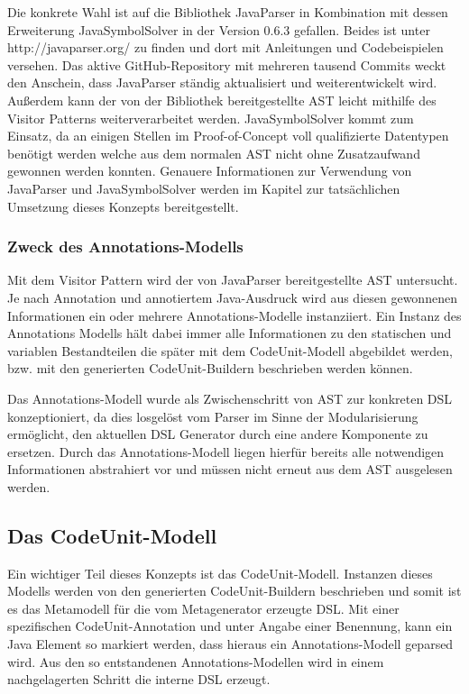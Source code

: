 \documentclass[12pt,oneside,a4paper,parskip]{scrbook}
\begin{document}
Die konkrete Wahl ist auf die Bibliothek JavaParser in Kombination mit dessen Erweiterung JavaSymbolSolver in der Version 0.6.3 gefallen. Beides ist unter http://javaparser.org/ zu finden und dort mit Anleitungen und Codebeispielen versehen. Das aktive GitHub-Repository mit mehreren tausend Commits weckt den Anschein, dass JavaParser ständig aktualisiert und weiterentwickelt wird. Außerdem kann der von der Bibliothek bereitgestellte AST leicht mithilfe des Visitor Patterns weiterverarbeitet werden. JavaSymbolSolver kommt zum Einsatz, da an einigen Stellen im Proof-of-Concept voll qualifizierte Datentypen benötigt werden welche aus dem normalen AST nicht ohne Zusatzaufwand gewonnen werden konnten. Genauere Informationen zur Verwendung von JavaParser und JavaSymbolSolver werden im Kapitel zur tatsächlichen Umsetzung dieses Konzepts bereitgestellt.

\subsubsection{Zweck des Annotations-Modells}

Mit dem Visitor Pattern wird der von JavaParser bereitgestellte AST untersucht. Je nach Annotation und annotiertem Java-Ausdruck wird aus diesen gewonnenen Informationen ein oder mehrere Annotations-Modelle instanziiert. Ein Instanz des Annotations Modells hält dabei immer alle Informationen zu den statischen und variablen Bestandteilen die später mit dem CodeUnit-Modell abgebildet werden, bzw. mit den generierten CodeUnit-Buildern beschrieben werden können. 

Das Annotations-Modell wurde als Zwischenschritt von AST zur konkreten DSL konzeptioniert, da dies losgelöst vom Parser im Sinne der Modularisierung ermöglicht, den aktuellen DSL Generator durch eine andere Komponente zu ersetzen. Durch das Annotations-Modell liegen hierfür bereits alle notwendigen Informationen abstrahiert vor und müssen nicht erneut aus dem AST ausgelesen werden.

\subsection{Das CodeUnit-Modell}

Ein wichtiger Teil dieses Konzepts ist das CodeUnit-Modell. Instanzen dieses Modells werden von den generierten CodeUnit-Buildern beschrieben und somit ist es das Metamodell für die vom Metagenerator erzeugte DSL. Mit einer spezifischen CodeUnit-Annotation und unter Angabe einer Benennung, kann ein Java Element so markiert werden, dass hieraus ein Annotations-Modell geparsed wird. Aus den so entstandenen Annotations-Modellen wird in einem nachgelagerten Schritt die interne DSL erzeugt.
\end{document}

